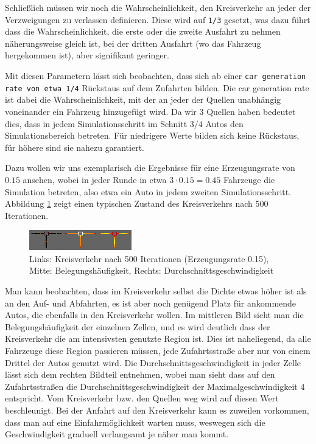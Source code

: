 \documentclass[11pt, a4paper]{article}
\begin{document}
Schließlich müssen wir noch die Wahrscheinlichkeit, den Kreisverkehr an jeder der Verzweigungen zu verlassen definieren. Diese wird auf \texttt{1/3} gesetzt, was dazu führt dass die Wahrscheinlichkeit, die erste oder die zweite Ausfahrt zu nehmen näherungsweise gleich ist, bei der dritten Ausfahrt (wo das Fahrzeug hergekommen ist), aber signifikant geringer.

Mit diesen Parametern lässt sich beobachten, dass sich ab einer \texttt{car generation rate von etwa 1/4} Rückstaus auf dem Zufahrten bilden. Die car generation rate ist dabei die Wahrscheinlichkeit, mit der an jeder der Quellen unabhängig voneinander ein Fahrzeug hinzugefügt wird. Da wir 3 Quellen haben bedeutet dies, dass in jedem Simulationsschritt im Schnitt $3/4$ Autos den Simulationsbereich betreten. Für niedrigere Werte bilden sich keine Rückstaus, für höhere sind sie nahezu garantiert.

Dazu wollen wir uns exemplarisch die Ergebnisse für eine Erzeugungsrate von $0.15$ ansehen, wobei in jeder Runde in etwa $3 \cdot 0.15 = 0.45$ Fahrzeuge die Simulation betreten, also etwa ein Auto in jedem zweiten Simulationsschritt. Abbildung \ref{fig:roundabout015} zeigt einen typischen Zustand des Kreisverkehrs nach 500 Iterationen.

\begin{figure}[h!]
	\centering
	\includegraphics[width=\textwidth]{img/roundabout_015}
	\caption{Links: Kreisverkehr nach 500 Iterationen (Erzeugungsrate 0.15), Mitte: Belegungshäufigkeit, Rechts: Durchschnittsgeschwindigkeit}
	\label{fig:roundabout015}
\end{figure}

Man kann beobachten, dass im Kreisverkehr selbst die Dichte etwas höher ist als an den Auf- und Abfahrten, es ist aber noch genügend Platz für ankommende Autos, die ebenfalls in den Kreisverkehr wollen. Im mittleren Bild sieht man die Belegungshäufigkeit der einzelnen Zellen, und es wird deutlich dass der Kreisverkehr die am intensivsten genutzte Region ist. Dies ist naheliegend, da alle Fahrzeuge diese Region passieren müssen, jede Zufahrtsstraße aber nur von einem Drittel der Autos genutzt wird. Die Durchschnittsgeschwindigkeit in jeder Zelle lässt sich dem rechten Bildteil entnehmen, wobei man sieht dass auf den Zufahrtsstraßen die Durchschnittsgeschwindigkeit der Maximalgeschwindigkeit 4 entspricht. Vom Kreisverkehr bzw. den Quellen weg wird auf diesen Wert beschleunigt. Bei der Anfahrt auf den Kreisverkehr kann es zuweilen vorkommen, dass man auf eine Einfahrmöglichkeit warten muss, weswegen sich die Geschwindigkeit graduell verlangsamt je näher man kommt.
\end{document}
